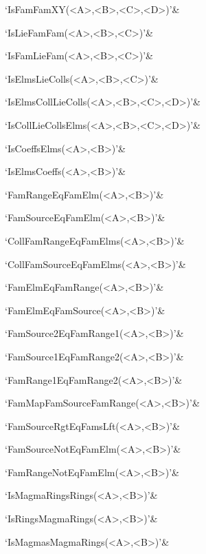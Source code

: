 `IsFamFamXY(<A>,<B>,<C>,<D>)'&

`IsLieFamFam(<A>,<B>,<C>)'&

`IsFamLieFam(<A>,<B>,<C>)'&

`IsElmsLieColls(<A>,<B>,<C>)'&

`IsElmsCollLieColls(<A>,<B>,<C>,<D>)'&

`IsCollLieCollsElms(<A>,<B>,<C>,<D>)'&

`IsCoeffsElms(<A>,<B>)'&

`IsElmsCoeffs(<A>,<B>)'&

`FamRangeEqFamElm(<A>,<B>)'&

`FamSourceEqFamElm(<A>,<B>)'&

`CollFamRangeEqFamElms(<A>,<B>)'&

`CollFamSourceEqFamElms(<A>,<B>)'&

`FamElmEqFamRange(<A>,<B>)'&

`FamElmEqFamSource(<A>,<B>)'&

`FamSource2EqFamRange1(<A>,<B>)'&

`FamSource1EqFamRange2(<A>,<B>)'&

`FamRange1EqFamRange2(<A>,<B>)'&

`FamMapFamSourceFamRange(<A>,<B>)'&

`FamSourceRgtEqFamsLft(<A>,<B>)'&

`FamSourceNotEqFamElm(<A>,<B>)'&

`FamRangeNotEqFamElm(<A>,<B>)'&

`IsMagmaRingsRings(<A>,<B>)'&

`IsRingsMagmaRings(<A>,<B>)'&

`IsMagmasMagmaRings(<A>,<B>)'&

\enditems


